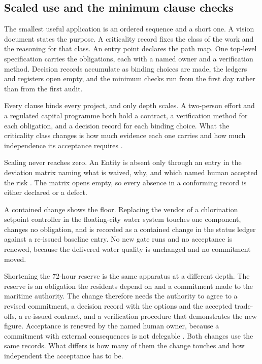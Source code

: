 \subsection{Scaled use and the minimum clause checks}

The smallest useful application is an ordered sequence and a short one. A vision document states the purpose. A criticality record fixes the class of the work and the reasoning for that class. An entry point declares the path map. One top-level specification carries the obligations, each with a named owner and a verification method. Decision records accumulate as binding choices are made, the ledgers and registers open empty, and the minimum checks run from the first day rather than from the first audit.

Every clause binds every project, and only depth scales. A two-person effort and a regulated capital programme both hold a contract, a verification method for each obligation, and a decision record for each binding choice. What the criticality class changes is how much evidence each one carries and how much independence its acceptance requires \citep[Sections~\hyperlink{nss-1.6}{1.6}, \hyperlink{nss-7.10}{7.10}, and~\hyperlink{nss-7.19}{7.19}]{pss2026}.

Scaling never reaches zero. An Entity is absent only through an entry in the deviation matrix naming what is waived, why, and which named human accepted the risk \citep[Section~\hyperlink{nss-1.5}{1.5}]{pss2026}. The matrix opens empty, so every absence in a conforming record is either declared or a defect.

A contained change shows the floor. Replacing the vendor of a chlorination setpoint controller in the floating-city water system touches one component, changes no obligation, and is recorded as a contained change in the status ledger against a re-issued baseline entry. No new gate runs and no acceptance is renewed, because the delivered water quality is unchanged and no commitment moved.

Shortening the 72-hour reserve is the same apparatus at a different depth. The reserve is an obligation the residents depend on and a commitment made to the maritime authority. The change therefore needs the authority to agree to a revised commitment, a decision record with the options and the accepted trade-offs, a re-issued contract, and a verification procedure that demonstrates the new figure. Acceptance is renewed by the named human owner, because a commitment with external consequences is not delegable \citep[Section~\hyperlink{nss-15.2}{15.2}]{pss2026}. Both changes use the same records. What differs is how many of them the change touches and how independent the acceptance has to be.

